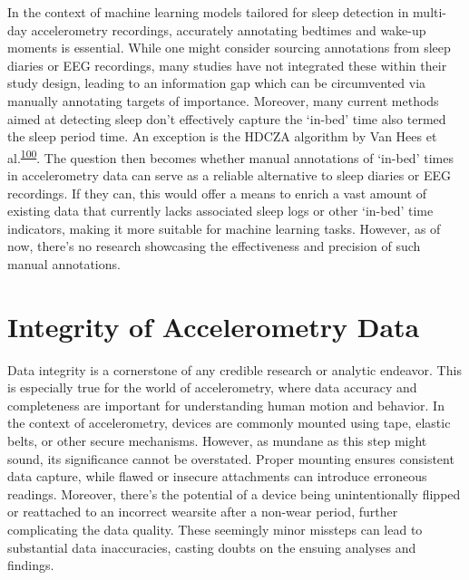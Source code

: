 \documentclass[
  10pt,
]{scrbook}
\begin{document}
In the context of machine learning models tailored for sleep detection
in multi-day accelerometry recordings, accurately annotating bedtimes
and wake-up moments is essential. While one might consider sourcing
annotations from sleep diaries or EEG recordings, many studies have not
integrated these within their study design, leading to an information
gap which can be circumvented via manually annotating targets of
importance. Moreover, many current methods aimed at detecting sleep
don't effectively capture the `in-bed' time also termed the sleep period
time. An exception is the HDCZA algorithm by Van Hees et
al.\textsuperscript{\protect\hyperlink{ref-van_hees_estimating_2018}{100}}.
The question then becomes whether manual annotations of `in-bed' times
in accelerometry data can serve as a reliable alternative to sleep
diaries or EEG recordings. If they can, this would offer a means to
enrich a vast amount of existing data that currently lacks associated
sleep logs or other `in-bed' time indicators, making it more suitable
for machine learning tasks. However, as of now, there's no research
showcasing the effectiveness and precision of such manual annotations.

\hypertarget{integrity-of-accelerometry-data}{%
\section{Integrity of Accelerometry
Data}\label{integrity-of-accelerometry-data}}

Data integrity is a cornerstone of any credible research or analytic
endeavor. This is especially true for the world of accelerometry, where
data accuracy and completeness are important for understanding human
motion and behavior. In the context of accelerometry, devices are
commonly mounted using tape, elastic belts, or other secure mechanisms.
However, as mundane as this step might sound, its significance cannot be
overstated. Proper mounting ensures consistent data capture, while
flawed or insecure attachments can introduce erroneous readings.
Moreover, there's the potential of a device being unintentionally
flipped or reattached to an incorrect wearsite after a non-wear period,
further complicating the data quality. These seemingly minor missteps
can lead to substantial data inaccuracies, casting doubts on the ensuing
analyses and findings.
\end{document}
